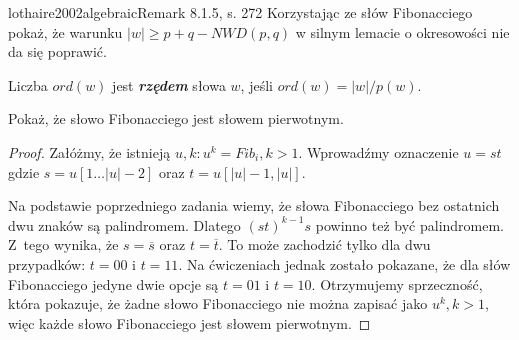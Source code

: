 \begin{problem}{lothaire2002algebraic}{Remark 8.1.5, s. 272}
  Korzystając ze słów Fibonacciego pokaż, że warunku $|w| \ge p + q - NWD(p, q)$ w silnym lemacie o okresowości nie da się poprawić.
\end{problem}

\begin{definition}{}{}
  Liczba $ord(w)$ jest \textbf{\textit{rzędem}} słowa $w$, jeśli $ord(w) = |w|/p(w)$.
\end{definition}

\begin{problem}{}{}
  Pokaż, że słowo Fibonacciego jest słowem pierwotnym.
\end{problem}

\begin{proof}
Załóżmy, że istnieją $u, k: u^k = Fib_i, k > 1$. Wprowadźmy oznaczenie $u = st$ gdzie $s = u[1\ldots|u|-2]$ oraz $t = u[|u|-1,|u|]$. 

Na podstawie poprzedniego zadania wiemy, że słowa Fibonacciego bez ostatnich dwu znaków są palindromem. Dlatego $(st)^{k-1}s$ powinno też być palindromem. Z~tego wynika, że $s = \overline{s}$ oraz $t = \overline{t}$. To może zachodzić tylko dla dwu przypadków: $t = 00$ i $t = 11$. Na ćwiczeniach jednak zostało pokazane, że dla słów Fibonacciego jedyne dwie opcje są $t = 01$ i $t = 10$. Otrzymujemy sprzeczność, która pokazuje, że żadne słowo Fibonacciego nie można zapisać jako $u^k, k > 1$, więc każde słowo Fibonacciego jest słowem pierwotnym.
\end{proof}